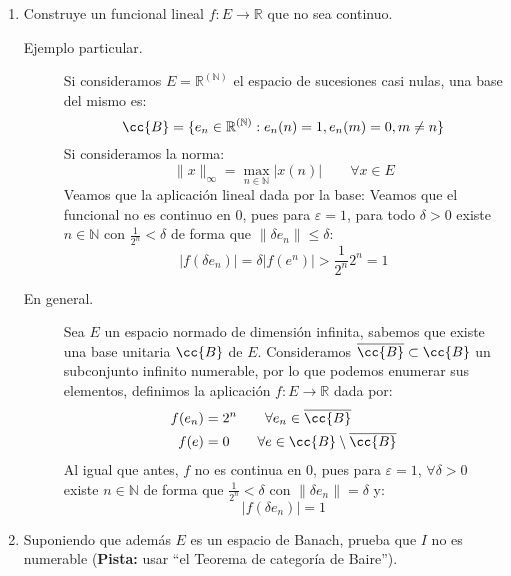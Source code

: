\begin{ejercicio}
\begin{enumerate}[label=\alph*)]
        \item Construye un funcional lineal $f:E\to \mathbb{R}$ que no sea continuo. 
            \begin{description}
                \item [Ejemplo particular.] Si consideramos $E = \mathbb{R}^{(\mathbb{N})}$ el espacio de sucesiones casi nulas, una base del mismo es:
                    \begin{equation*}
                        \cc{B} = \{e_n \in \mathbb{R}^{(\mathbb{N})} : e_n(n) = 1, e_n(m) = 0, m\neq n\}
                    \end{equation*}
                    Si consideramos la norma:
                    \begin{equation*}
                        \|x\|_\infty = \max_{n\in \mathbb{N}}|x(n)| \qquad \forall x\in E
                    \end{equation*}
                    Veamos que la aplicación lineal dada por la base:
                    Veamos que el funcional no es continuo en 0, pues para $\varepsilon=1$, para todo $\delta>0$ existe $n\in \mathbb{N}$ con $\frac{1}{2^n}<\delta$ de forma que $\|\delta e_n\| \leq \delta$:
                    \begin{equation*}
                        |f(\delta e_n)| = \delta|f(e^{n})| > \frac{1}{2^n}2^n = 1
                    \end{equation*}
                \item [En general.] Sea $E$ un espacio normado de dimensión infinita, sabemos que existe una base unitaria $\cc{B}$ de $E$. Consideramos $\overline{\cc{B}}\subset \cc{B}$ un subconjunto infinito numerable, por lo que podemos enumerar sus elementos, definimos la aplicación $f:E\to \mathbb{R}$ dada por:
                    \begin{align*}
                        f(e_n) &= 2^n \qquad \forall e_n \in \overline{\cc{B}} \\
                        f(e) &= 0 \qquad \forall e \in \cc{B}\setminus\overline{\cc{B}}
                    \end{align*}
                    Al igual que antes, $f$ no es continua en $0$, pues para $\varepsilon=1$, $\forall \delta>0$ existe $n\in \mathbb{N}$ de forma que $\frac{1}{2^n}<\delta$ con $\|\delta e_n\| = \delta$ y:
                    \begin{equation*}
                        |f(\delta e_n)| = 1
                    \end{equation*}
            \end{description}
        \item Suponiendo que además $E$ es un espacio de Banach, prueba que $I$ no es numerable (\textbf{Pista:} usar ``el Teorema de categoría de Baire'').


\end{enumerate}
\end{ejercicio}
